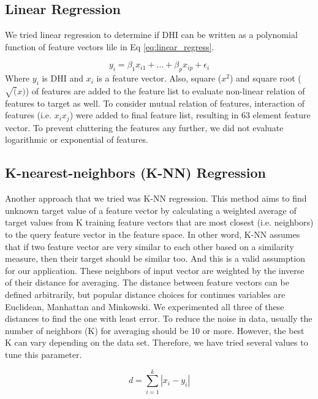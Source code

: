 \subsection{Linear Regression}
\label{sec:lin_reg}
We tried linear regression to determine if DHI can be written as a polynomial function of feature vectors lile in Eq \ref{eq:linear_regress}.

\begin{equation}
\label{eq:linear_regress}
y_i = \beta_{1}x_{i1} + \ldots + \beta_{p}x_{ip} + \epsilon_{i}
\end{equation}
Where $y_i$ is DHI and $x_i$ is a feature vector. Also, square ($x^{2}$) and square root ($\sqrt(x)$) of features are added to the feature list to evaluate non-linear relation of features to target as well. To consider mutual relation of features, interaction of features (i.e. $x_{i}x_{j}$) were added to final feature list, resulting in 63 element feature vector. To prevent cluttering the features any further, we did not evaluate logarithmic or exponential of features.

\subsection{K-nearest-neighbors (K-NN) Regression}
Another approach that we tried was K-NN regression. This method aims to find unknown target value of a feature vector by calculating a weighted average of target values from K training feature vectors that are most closest (i.e. neighbors) to the query feature vector in the feature space. In other word, K-NN assumes that if two feature vector are very similar to each other based on a similarity measure, then their target should be similar too. And this is a valid assumption for our application. These neighbors of input vector are weighted by the inverse of their distance for averaging. The distance between feature vectors can be defined arbitrarily, but popular distance choices for continues variables are Euclidean, Manhattan and Minkowski. We experimented all three of these distances to find the one with least error. To reduce the noise in data, usually the number of neighbors (K) for averaging should be 10 or more. However, the best K can vary depending on the data set. Therefore, we have tried several values to tune this parameter.

\begin{equation}
\label{eq:manhattan_distance}
d = \sum_{i=1}^{k} |x_i - y_i|
\end{equation}

